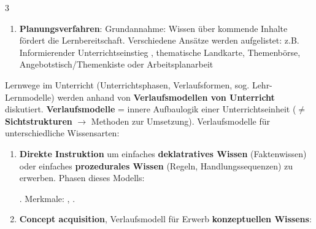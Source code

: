 \begin{landscape}
\begin{multicols*}{3}
\begin{myBox}[title=\enquote{Unterrichtsplanung und Methoden} \cite{kaiser}]
\begin{enumerate}
\begin{enumerate}
                \item \textbf{Planungsverfahren}: Grundannahme: Wissen über kommende Inhalte fördert die Lernbereitschaft. Verschiedene Ansätze werden aufgelistet: z.B. Informierender Unterrichtseinstieg \cite{grell}, thematische Landkarte, Themenbörse, Angebotstisch/Themenkiste oder Arbeitsplanarbeit
              \end{enumerate}
      \end{enumerate}
    \end{myBox}\begin{myBox}[title=\enquote{Lehr-Lernprozesse in der Schule: Studium} \cite{maier}]
      Lernwege im Unterricht (Unterrichtsphasen, Verlaufsformen, sog. Lehr-Lernmodelle) werden anhand von \textbf{Verlaufsmodellen von Unterricht} diskutiert.  \textbf{Verlaufsmodelle} = innere Aufbaulogik einer Unterrichtseinheit ($\neq$ \textbf{Sichtstrukturen} $\rightarrow$ Methoden zur Umsetzung). Verlaufsmodelle für unterschiedliche Wissensarten:
      \begin{enumerate}
        \item \textbf{Direkte Instruktion} um einfaches \textbf{deklatratives Wissen} (Faktenwissen) oder einfaches \textbf{prozedurales Wissen} (Regeln, Handlungssequenzen) zu erwerben. Phasen dieses Modells: . Merkmale:  , .
        \item \textbf{Concept acquisition}, Verlaufsmodell für Erwerb \textbf{konzeptuellen Wissens}:
\end{enumerate}
\end{myBox}
\end{multicols*}
\end{landscape}

